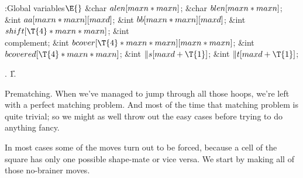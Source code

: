 \B{}:Global variables\X${}\E{}$\6
\&{char} ${}\\{alen}[\\{maxn}*\\{maxn}]{}$;\6
\&{char} ${}\\{blen}[\\{maxn}*\\{maxn}]{}$;\6
\&{int} ${}\\{aa}[\\{maxn}*\\{maxn}][\\{maxd}]{}$;\6
\&{int} ${}\\{bb}[\\{maxn}*\\{maxn}][\\{maxd}]{}$;\6
\&{int} ${}\\{shift}[\T{4}*\\{maxn}*\\{maxn}]{}$;\6
\&{int} \\{complement};\6
\&{int} ${}\\{bcover}[\T{4}*\\{maxn}*\\{maxn}][\\{maxn}*\\{maxn}]{}$;\6
\&{int} ${}\\{bcovered}[\T{4}*\\{maxn}*\\{maxn}]{}$;\6
\&{int} ${}\|s[\\{maxd}+\T{1}]{}$;\6
\&{int} ${}\|t[\\{maxd}+\T{1}]{}$;\par
{}.
\U1.\fi

Prematching.
When we've managed to jump through all those hoops, we're left with
a perfect matching problem. And most of the time that matching problem
is quite trivial; so we might as well throw out the easy cases before
trying to do anything fancy.

In most cases some of the moves turn out to be forced, because a
cell of the square has only one possible shape-mate or vice versa.
We start by making all of those no-brainer moves.


